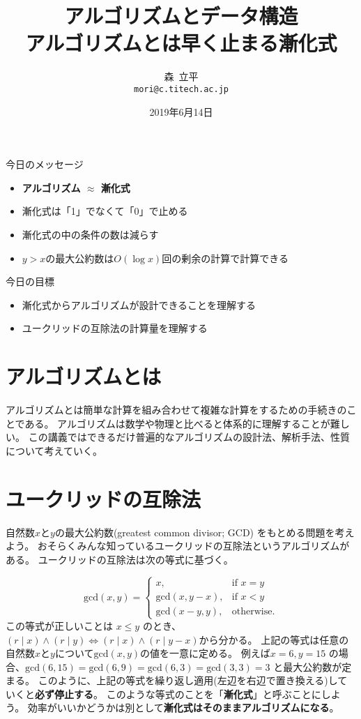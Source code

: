 \documentclass[a4paper,twoside,onecolumn,openany,article,10pt]{memoir}
\title{アルゴリズムとデータ構造\\\vspace{.5em} \Large アルゴリズムとは早く止まる漸化式}
\date{2019年6月14日}
\author{森~立平\\ \texttt{mori@c.titech.ac.jp}}
\theoremstyle{remark}
\begin{document}
\maketitle


\noindent
今日のメッセージ
\begin{itemize}
\item \textbf{アルゴリズム $\approx$ 漸化式}
\item 漸化式は「1」でなくて「0」で止める
\item 漸化式の中の条件の数は減らす
\item $y>x$の最大公約数は$O(\log x)$回の剰余の計算で計算できる
\end{itemize}

\noindent
今日の目標
\begin{itemize}
\item 漸化式からアルゴリズムが設計できることを理解する
\item ユークリッドの互除法の計算量を理解する
\end{itemize}


\section{アルゴリズムとは}
アルゴリズムとは簡単な計算を組み合わせて複雑な計算をするための手続きのことである。
アルゴリズムは数学や物理と比べると体系的に理解することが難しい。
この講義ではできるだけ普遍的なアルゴリズムの設計法、解析手法、性質について考えていく。

\section{ユークリッドの互除法}
自然数$x$と$y$の最大公約数(greatest common divisor; GCD) をもとめる問題を考えよう。
おそらくみんな知っているユークリッドの互除法というアルゴリズムがある。
ユークリッドの互除法は次の等式に基づく。

\begin{equation}
\mathrm{gcd}(x, y) =
\begin{cases}
x,& \text{if } x = y\\
\mathrm{gcd}(x, y-x),& \text{if } x < y\\
\mathrm{gcd}(x-y, y),& \text{otherwise.}
\end{cases}
\label{eq:gcd1}
\end{equation}
この等式が正しいことは $x\le y$ のとき、$(r\mid x) \land (r\mid y) \iff (r\mid x) \land (r\mid y-x)$から分かる。
上記の等式は任意の自然数$x$と$y$について$\mathrm{gcd}(x, y)$の値を一意に定める。
例えば$x=6, y=15$ の場合、$\mathrm{gcd}(6, 15) = \mathrm{gcd}(6, 9) = \mathrm{gcd}(6, 3) = \mathrm{gcd}(3, 3) = 3$ と最大公約数が定まる。
このように、上記の等式を繰り返し適用(左辺を右辺で置き換える)していくと\textbf{必ず停止する}。
このような等式のことを「\textbf{漸化式}」と呼ぶことにしよう。
効率がいいかどうかは別として\textbf{漸化式はそのままアルゴリズムになる}。
\end{document}
